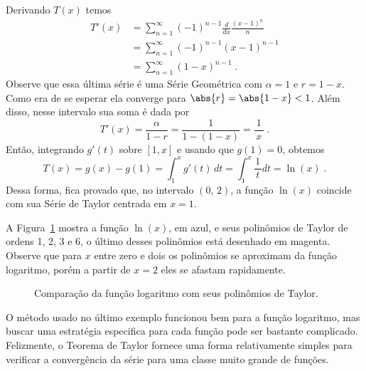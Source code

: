 \begin{example}
  Derivando \(T(x)\) temos
  \begin{align*}
    T'(x)
    & = \sum_{n=1}^\infty (-1)^{n-1}\frac{d}{dx}\frac{(x-1)^n}{n} \\[3mm]
    & = \sum_{n=1}^\infty (-1)^{n-1}(x-1)^{n-1} \\[3mm]
    & = \sum_{n=1}^\infty (1-x)^{n-1}    \;.
  \end{align*}
  Observe que essa última série é uma Série Geométrica com $\alpha=1$ e $r=1-x$.
  Como era de se esperar ela converge para $\abs{r}=\abs{1-x}<1$.
  Além disso, nesse intervalo sua soma é dada por
  \[
    T'(x) = \frac{\alpha}{1-r}
          = \frac{1}{1-(1-x)}
          = \frac{1}{\,x\,}   \;.
  \]
  Então, integrando $g'(t)$ sobre $[1, x]$ e usando que $g(1)=0$, obtemos
  \[
    T(x) = g(x) - g(1)
         = \int_1^x g'(t)\,dt
         = \int_1^x \frac{1}{\,t\,} dt
         = \ln(x)   \;.
  \]
  Dessa forma, fica provado que, no intervalo $(0,\,2)$, a função $\ln(x)$
  coincide com sua Série de Taylor centrada em $x=1$.

\end{example}

A Figura~\ref{fig:funcao_tayplor_logaritmo} mostra a função $\ln(x)$, em azul,
e seus polinômios de Taylor de ordens 1, 2, 3 e 6, o último desses polinômios
está desenhado em magenta. Observe que para $x$ entre zero e dois os polinômios
se aproximam da função logaritmo, porém a partir de $x=2$ eles se afastam
rapidamente.

\begin{figure}
  \begin{center}%
    \vspace{-0.2\baselineskip}%
    \scalebox{0.9}{}%
    \vspace{-\baselineskip}%
  \end{center}
  \caption{Comparação da função logaritmo com seus polinômios de Taylor.}
  \label{fig:funcao_tayplor_logaritmo}
\end{figure}

O método usado no último exemplo funcionou bem para a função logaritmo,
mas buscar uma estratégia especifica para cada função pode ser
bastante complicado.
Felizmente, o Teorema de Taylor fornece uma forma relativamente
simples para verificar a convergência da série para uma
classe muito grande de funções.

